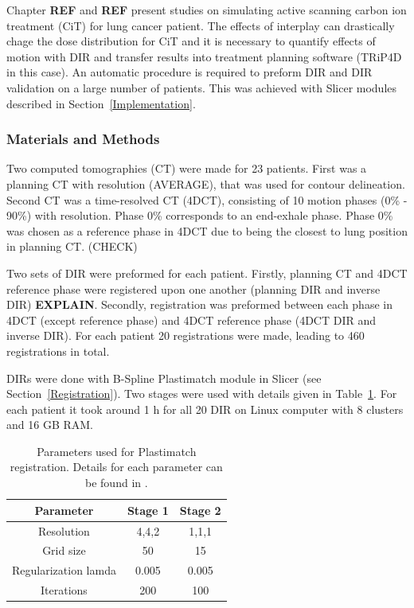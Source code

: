 \documentclass[type=dr, dr=rernat, accentcolor=tud7b,colorbacktitle, bigchapter, openright, twoside, 12pt ]{tudthesis}
\begin{document}
Chapter \textbf{REF} and \textbf{REF} present studies on simulating active scanning carbon ion treatment (CiT) for lung cancer patient. The effects of interplay can drastically chage the dose distribution for CiT and it is necessary to quantify effects of motion with DIR and transfer results into
treatment planning software (TRiP4D in this case). An automatic procedure is required to preform DIR and DIR validation on a large number of patients. This was achieved with Slicer modules described in Section~\ref{Implementation}.

\subsubsection{Materials and Methods}

Two computed tomographies (CT) were made for 23 patients. First was a planning CT with resolution (AVERAGE), that was used for contour delineation. Second CT was a time-resolved CT (4DCT), consisting of 10 motion phases (0\% - 90\%) with resolution.
Phase 0\% corresponds to an end-exhale phase. Phase 0\% was chosen as a reference phase in 4DCT due to being the closest to lung position in planning CT. (CHECK)

Two sets of DIR were preformed for each patient. Firstly, planning CT and 4DCT reference phase were registered upon one another (planning DIR and inverse DIR) \textbf{EXPLAIN}. Secondly, registration was preformed between each phase in 4DCT
(except reference phase) and 4DCT reference phase (4DCT DIR and inverse DIR). For each patient 20 registrations were made, leading to 460 registrations in total.

DIRs were done with B-Spline Plastimatch module in Slicer (see Section~\ref{Registration}). Two stages were used with details given in Table~\ref{tab:stages}. For each patient it took around 1 h for all 20 DIR on Linux computer with 8 clusters and 16 GB RAM.

\begin{table}[H]
  \centering
  \caption{Parameters used for Plastimatch registration. Details for each parameter can be found in \cite{Plastimatch}.}
  \begin{tabular}{c|c|c}
      Parameter & Stage 1 & Stage 2 \\
      \hline
      Resolution & 4,4,2 & 1,1,1 \\
      Grid size & 50 & 15 \\
      Regularization lamda & 0.005 & 0.005 \\
      Iterations & 200 & 100 \\
    \hline\hline
  \end{tabular}
  \label{tab:stages}
\end{table}
\end{document}
